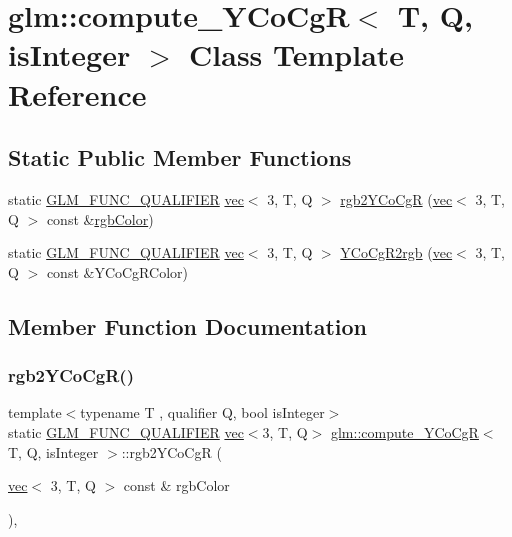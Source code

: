 \hypertarget{classglm_1_1compute___y_co_cg_r}{}\section{glm\+:\+:compute\+\_\+\+Y\+Co\+CgR$<$ T, Q, is\+Integer $>$ Class Template Reference}
\label{classglm_1_1compute___y_co_cg_r}
\subsection*{Static Public Member Functions}
\begin{DoxyCompactItemize}
\item 
static \hyperlink{setup_8hpp_a33fdea6f91c5f834105f7415e2a64407}{G\+L\+M\+\_\+\+F\+U\+N\+C\+\_\+\+Q\+U\+A\+L\+I\+F\+I\+ER} \hyperlink{structglm_1_1vec}{vec}$<$ 3, T, Q $>$ \hyperlink{classglm_1_1compute___y_co_cg_r_a54c896f58edbb8d14d522358dde783a9}{rgb2\+Y\+Co\+CgR} (\hyperlink{structglm_1_1vec}{vec}$<$ 3, T, Q $>$ const \&\hyperlink{group__gtx__color__space_ga5f9193be46f45f0655c05a0cdca006db}{rgb\+Color})
\item 
static \hyperlink{setup_8hpp_a33fdea6f91c5f834105f7415e2a64407}{G\+L\+M\+\_\+\+F\+U\+N\+C\+\_\+\+Q\+U\+A\+L\+I\+F\+I\+ER} \hyperlink{structglm_1_1vec}{vec}$<$ 3, T, Q $>$ \hyperlink{classglm_1_1compute___y_co_cg_r_a90eb0aada34098a657429dea2323e00a}{Y\+Co\+Cg\+R2rgb} (\hyperlink{structglm_1_1vec}{vec}$<$ 3, T, Q $>$ const \&Y\+Co\+Cg\+R\+Color)
\end{DoxyCompactItemize}


\subsection{Member Function Documentation}
\mbox{\label{classglm_1_1compute___y_co_cg_r_a54c896f58edbb8d14d522358dde783a9}} 
\subsubsection{\texorpdfstring{rgb2\+Y\+Co\+Cg\+R()}{rgb2YCoCgR()}}
{\footnotesize\ttfamily template$<$typename T , qualifier Q, bool is\+Integer$>$ \\
static \hyperlink{setup_8hpp_a33fdea6f91c5f834105f7415e2a64407}{G\+L\+M\+\_\+\+F\+U\+N\+C\+\_\+\+Q\+U\+A\+L\+I\+F\+I\+ER} \hyperlink{structglm_1_1vec}{vec}$<$3, T, Q$>$ \hyperlink{classglm_1_1compute___y_co_cg_r}{glm\+::compute\+\_\+\+Y\+Co\+CgR}$<$ T, Q, is\+Integer $>$\+::rgb2\+Y\+Co\+CgR (\begin{DoxyParamCaption}\item[{\hyperlink{structglm_1_1vec}{vec}$<$ 3, T, Q $>$ const \&}]{rgb\+Color }\end{DoxyParamCaption})\hspace{0.3cm}{\ttfamily [inline]}, {\ttfamily [static]}}

